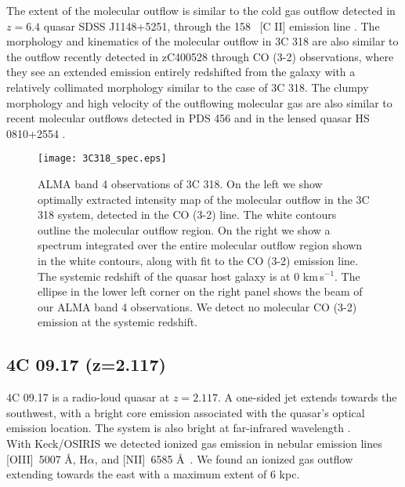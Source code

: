 \documentclass[twocolumn]{aastex63}
\newcommand{\ha}{H$\alpha$\xspace}
\newcommand{\nii}{[N{\sc II}]\xspace}
\newcommand{\oiii}{[O{\sc III}]\xspace}
\newcommand{\kms}{km\,s$^{-1}$}
\begin{document}
The extent of the molecular outflow is similar to the cold gas outflow detected in $z=6.4$ quasar SDSS J1148+5251, through the 158 \micron\ [C II] emission line \citep{Cicone15}. The morphology and kinematics of the molecular outflow in 3C 318 are also similar to the outflow recently detected in zC400528 \citep{Herrera-Camus19} through CO (3-2) observations, where they see an extended emission entirely redshifted from the galaxy with a relatively collimated morphology similar to the case of 3C 318. The clumpy morphology and high velocity of the outflowing molecular gas are also similar to recent molecular outflows detected in PDS 456 \citep{Bischetti19} and in the lensed quasar HS 0810+2554 \citep{Chartas20}.


\begin{figure*}[!th]
    \centering
    \texttt{[image: 3C318\_spec.eps]}
    \caption{ALMA band 4 observations of 3C 318. On the left we show optimally extracted intensity map of the molecular outflow in the 3C 318 system, detected in the CO (3-2) line. The white contours outline the molecular outflow region. On the right we show a spectrum integrated over the entire molecular outflow region shown in the white contours, along with fit to the CO (3-2) emission line. The systemic redshift of the quasar host galaxy is at 0 \kms. The ellipse in the lower left corner on the right panel shows the beam of our ALMA band 4 observations. We detect no molecular CO (3-2) emission at the systemic redshift.}
    \label{fig:3C318_spec}
\end{figure*}


\subsection{4C 09.17 (z=2.117)}\label{sec:4c0917}

4C 09.17 is a radio-loud quasar at $z=2.117$. A one-sided jet extends towards the southwest, with a bright core emission associated with the quasar's optical emission location. The system is also bright at far-infrared wavelength \citep{Podigachoski15}. \\

With Keck/OSIRIS we detected ionized gas emission in nebular emission lines \oiii\ 5007 \AA, \ha, and \nii\ 6585 \AA\ \citep{Vayner19b}. We found an ionized gas outflow extending towards the east with a maximum extent of 6 kpc.\\ 
\end{document}
